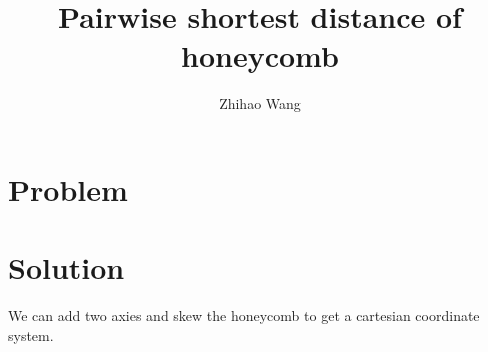 \documentclass[12pt]{article}
\title{Pairwise shortest distance of honeycomb}
\author{Zhihao Wang}
\begin{document}
\maketitle

\section{Problem}

\begin{center}
\end{center}

\section{Solution}
We can add two axies and skew the honeycomb to get a cartesian coordinate system.

\begin{center}
\end{center}
\end{document}
